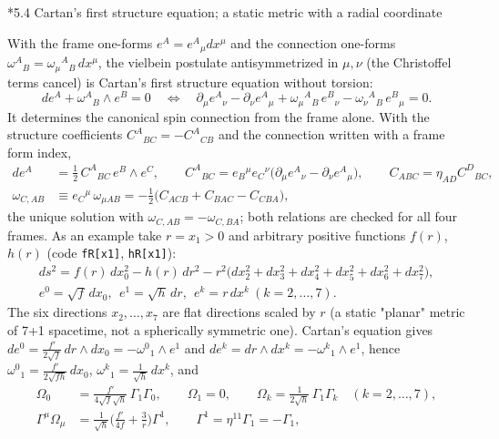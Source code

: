 \documentclass[10pt,a4paper]{article}
\makeatletter
\renewcommand\subsection{\@startsection{subsection}{2}{\z@}{-3.25ex\@plus -1ex \@minus -.2ex}{1.5ex \@plus .2ex}{\normalfont\large\bfseries\raggedright}}
\makeatother
\begin{document}
\subsection*{5.4 Cartan’s first structure equation; a static metric with a radial coordinate}
With the frame one-forms $e^A=e^A{}_\mu dx^\mu$ and the connection one-forms $\omega^A{}_B=\omega_\mu{}^A{}_B\,dx^\mu$, the vielbein postulate antisymmetrized in $\mu,\nu$ (the Christoffel terms cancel) is Cartan’s first structure equation without torsion:
\begin{equation*}
de^A+\omega^A{}_B\wedge e^B=0\quad\Longleftrightarrow\quad \partial_\mu e^A{}_\nu-\partial_\nu e^A{}_\mu+\omega_\mu{}^A{}_B\,e^B{}_\nu-\omega_\nu{}^A{}_B\,e^B{}_\mu=0 .
\end{equation*}
It determines the canonical spin connection from the frame alone. With the structure coefficients $C^A{}_{BC}=-C^A{}_{CB}$ and the connection written with a frame form index,
\begin{align*}
de^A&=\tfrac12\,C^A{}_{BC}\,e^B\wedge e^C,\qquad C^A{}_{BC}=e_B{}^\mu e_C{}^\nu\big(\partial_\mu e^A{}_\nu-\partial_\nu e^A{}_\mu\big),\qquad C_{ABC}=\eta_{AD}C^D{}_{BC}, \\
\omega_{C,AB}&\equiv e_C{}^\mu\,\omega_{\mu AB}=-\tfrac12\big(C_{ACB}+C_{BAC}-C_{CBA}\big),
\end{align*}
the unique solution with $\omega_{C,AB}=-\omega_{C,BA}$; both relations are checked for all four frames. As an example take $r=x_1>0$ and arbitrary positive functions $f(r)$, $h(r)$ (code \texttt{fR[x1]}, \texttt{hR[x1]}):
\begin{gather*}
ds^2=f(r)\,dx_0^2-h(r)\,dr^2-r^2\big(dx_2^2+dx_3^2+dx_4^2+dx_5^2+dx_6^2+dx_7^2\big),\\ e^0=\sqrt f\,dx_0,\ \ e^1=\sqrt h\,dr,\ \ e^k=r\,dx^k\ (k=2,\dots,7).
\end{gather*}
The six directions $x_2,\dots,x_7$ are flat directions scaled by $r$ (a static "planar" metric of 7+1 spacetime, not a spherically symmetric one). Cartan’s equation gives $de^0=\frac{f'}{2\sqrt f}\,dr\wedge dx_0=-\omega^0{}_1\wedge e^1$ and $de^k=dr\wedge dx^k=-\omega^k{}_1\wedge e^1$, hence $\omega^0{}_1=\frac{f'}{2\sqrt{fh}}\,dx_0$, $\omega^k{}_1=\frac{1}{\sqrt h}\,dx^k$, and
\begin{align*}
\Omega_0&=\frac{f'}{4\sqrt f\sqrt h}\,\Gamma_1\Gamma_0,\qquad \Omega_1=0,\qquad \Omega_k=\frac{1}{2\sqrt h}\,\Gamma_1\Gamma_k\quad(k=2,\dots,7), \\
\Gamma^\mu\Omega_\mu&=\frac{1}{\sqrt h}\Big(\frac{f'}{4f}+\frac3r\Big)\Gamma^1,\qquad \Gamma^1=\eta^{11}\Gamma_1=-\Gamma_1,
\end{align*}
\end{document}
